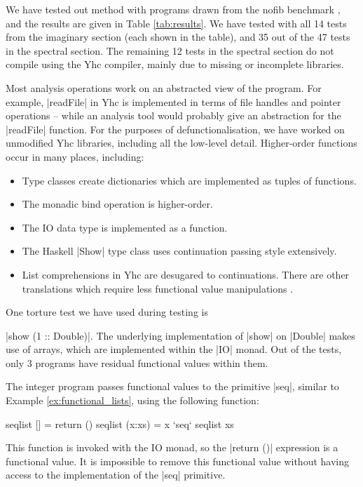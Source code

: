 \documentclass[preprint]{sigplanconf}
\begin{document}
We have tested out method with programs drawn from the nofib benchmark \cite{nofib}, and the results are given in Table \ref{tab:results}. We have tested with all 14 tests from the imaginary section (each shown in the table), and 35 out of the 47 tests in the spectral section. The remaining 12 tests in the spectral section do not compile using the Yhc compiler, mainly due to missing or incomplete libraries.

Most analysis operations work on an abstracted view of the program. For example, |readFile| in Yhc is implemented in terms of file handles and pointer operations -- while an analysis tool would probably give an abstraction for the |readFile| function. For the purposes of defunctionalisation, we have worked on unmodified Yhc libraries, including all the low-level detail. Higher-order functions occur in many places, including:

\begin{itemize}
\item Type classes create dictionaries which are implemented as tuples of functions.
\item The monadic bind operation is higher-order.
\item The IO data type is implemented as a function.
\item The Haskell |Show| type class uses continuation passing style extensively.
\item List comprehensions in Yhc are desugared to continuations. There are other translations which require less functional value manipulations \cite{wadler:list_comprehensions,coutts:stream_fusion}.
\end{itemize}

One torture test we have used during testing is \ignore|show (1 :: Double)|. The underlying implementation of |show| on |Double| makes use of arrays, which are implemented within the |IO| monad. Out of the tests, only 3 programs have residual functional values within them.

The integer program passes functional values to the primitive |seq|, similar to Example \ref{ex:functional_lists}, using the following function:

\begin{code}
seqlist [] = return ()
seqlist (x:xs) = x `seq` seqlist xs
\end{code}

This function is invoked with the IO monad, so the |return ()| expression is a functional value. It is impossible to remove this functional value without having access to the implementation of the |seq| primitive.
\end{document}
